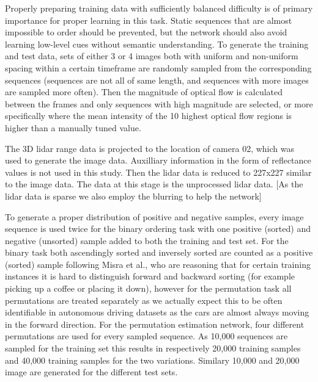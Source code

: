 Properly preparing training data with sufficiently balanced difficulty is of primary importance for proper learning in this task. Static sequences that are almost impossible to order should be prevented, but the network should also avoid learning low-level cues without semantic understanding. To generate the training and test data, sets of either 3 or 4 images both with uniform and non-uniform spacing within a certain timeframe are randomly sampled from the corresponding sequences (sequences are not all of same length, and sequences with more images are sampled more often). Then the magnitude of optical flow is calculated between the frames and only sequences with high magnitude are selected\cite{misra2016}, or more specifically where the mean intensity of the 10 highest optical flow regions is higher than a manually tuned value. 


The 3D lidar range data is projected to the location of camera 02, which was used to generate the image data. Auxilliary information in the form of reflectance values is not used in this study. Then the lidar data is reduced to 227x227 similar to the image data. The data at this stage is the unprocessed lidar data. [As the lidar data is sparse we also employ the blurring to help the network]

To generate a proper distribution of positive and negative samples, every image sequence is used twice for the binary ordering task with one positive (sorted) and negative (unsorted) sample added to both the training and test set. For the binary task both ascendingly sorted and inversely sorted are counted as a positive (sorted) sample following Misra et al., who are reasoning that for certain training instances it is hard to distinguish forward and backward sorting (for example picking up a coffee or placing it down), however for the permutation task all permutations are treated separately as we actually expect this to be often identifiable in autonomous driving datasets as the cars are almost always moving in the forward direction. For the permutation estimation network, four different permutations are used for every sampled sequence. As 10,000 sequences are sampled for the training set this results in respectively 20,000 training samples and 40,000 training samples for the two variations. Similary 10,000 and 20,000 image are generated for the different test sets. 

